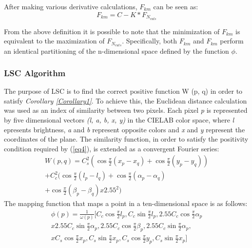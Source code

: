 After making various derivative calculations, $ F_{km} $ can be seen as: 
\begin{equation}
    F_{km} = C - K * F_{N_{cuts}} 
\end{equation}

From the above definition it is possible to note that the minimization of 
$ F_{km} $ is equivalent to the maximization of $ F_{N_{cuts}} $. Specifically, both $ F_{km} $ and 
$ F_{km} $ perform an identical partitioning of the n-dimensional space defined by 
the function $ \phi $.

\subsubsection{LSC Algorithm}
The purpose of LSC is to find the correct positive function W (p, q) in order 
to satisfy {\emph{Corollary \ref{Corollary1}}}. To achieve this, the Euclidean distance calculation 
was used as an index of similarity between two pixels. Each pixel \emph{p} is represented 
by five dimensional vectors \emph{(l, a, b, x, y)} in the CIELAB color space, where \emph{l} 
epresents brightness, \emph{a} and \emph{b} represent opposite colors and \emph{x} and \emph{y} represent
the coordinates of the plane. The similarity function, in order to satisfy 
the positivity condition required by (\ref{eq4}), is extended as a convergent Fourier series: 
\begin{equation}
    \begin{split}
        W(p,q) = C_s^2(\cos \frac{\pi}{2}(x_p-x_q)+\cos\frac{\pi}{2}(y_p-y_q)) \\
        + C_c^2(\cos \frac{\pi}{2}(l_p-l_q)+\cos\frac{\pi}{2}(\alpha_p-\alpha_q) \\
        + \cos\frac{\pi}{2}(\beta_p-\beta_q)x2.55^2)
    \end{split}
\end{equation}
The mapping function that maps a point in a ten-dimensional space is as follows:
\begin{equation}
    \begin{split}
        \phi(p) = \frac{1}{\omega(p)}[C_c\cos\frac{\pi}{2}l_p, C_c\sin\frac{\pi}{2}l_p, 2.55C_c\cos\frac{\pi}{2}\alpha_p \\
        x 2.55C_c\sin\frac{\pi}{2}\alpha_p, 2.55C_c\cos\frac{\pi}{2}\beta_p, 2.55C_c\sin\frac{\pi}{2}\alpha_p, \\
        x C_s\cos\frac{\pi}{2}x_p, C_s\sin\frac{\pi}{2}x_p, C_s\cos\frac{\pi}{2}y_p, C_s\sin\frac{\pi}{2}x_p]
    \end{split}
\end{equation}
